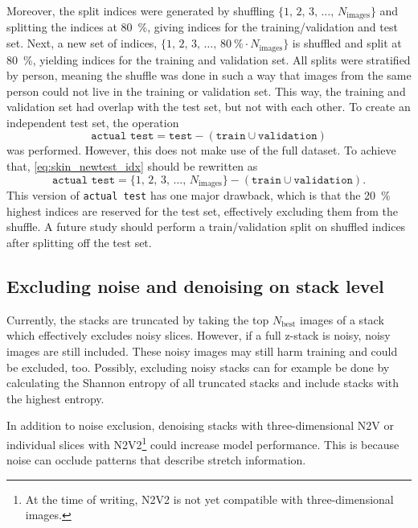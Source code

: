 Moreover, the split indices were generated by shuffling $\{1,\, 2,\, 3,\, \ldots,\, N_\mathrm{images}\}$ and splitting the indices at \qty{80}{\percent}, giving indices for the training/validation and test set.
Next, a new set of indices, $\{1,\, 2,\, 3,\, \ldots,\, \qty{80}{\percent} \cdot N_\mathrm{images}\}$ is shuffled and split at \qty{80}{\percent}, yielding indices for the training and validation set.
All splits were stratified by person, meaning the shuffle was done in such a way that images from the same person could not live in the training or validation set.
This way, the training and validation set had overlap with the test set, but not with each other.
To create an independent test set, the operation
\begin{equation}\label{eq:skin_newtest_idx}
    \texttt{actual test} = \texttt{test} - (\texttt{train} \cup \texttt{validation})
\end{equation}
was performed.
However, this does not make use of the full dataset.
To achieve that, \cref{eq:skin_newtest_idx} should be rewritten as
\begin{equation}
    \texttt{actual test} = \{1,\, 2,\, 3,\, \ldots,\, N_\mathrm{images}\} - (\texttt{train} \cup \texttt{validation}).
\end{equation}
This version of \texttt{actual test} has one major drawback, which is that the \qty{20}{\percent} highest indices are reserved for the test set, effectively excluding them from the shuffle.
A future study should perform a train/validation split on shuffled indices after splitting off the test set.

\subsection{Excluding noise and denoising on stack level}
Currently, the stacks are truncated by taking the top $N_\mathrm{best}$ images of a stack which effectively excludes noisy slices.
However, if a full z-stack is noisy, noisy images are still included.
These noisy images may still harm training and could be excluded, too.
Possibly, excluding noisy stacks can for example be done by calculating the Shannon entropy of all truncated stacks and include stacks with the highest entropy.

In addition to noise exclusion, denoising stacks with three-dimensional N2V or individual slices with N2V2\footnote{At the time of writing, N2V2 is not yet compatible with three-dimensional images.} could increase model performance.
This is because noise can occlude patterns that describe stretch information.

